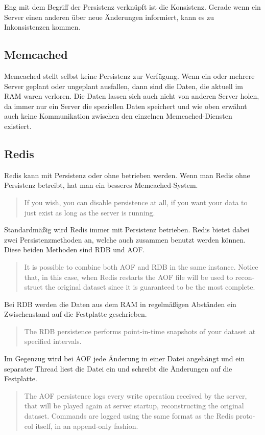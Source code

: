 Eng mit dem Begriff der Persistenz verknüpft ist die Konsistenz. Gerade wenn
ein Server einen anderen über neue Änderungen informiert, kann es zu
Inkonsistenzen kommen.

\subsection{Memcached}
Memcached stellt selbst keine Persistenz zur Verfügung. Wenn ein oder mehrere
Server geplant oder ungeplant ausfallen, dann sind die Daten, die aktuell im
\gls{RAM} waren verloren. Die Daten lassen sich auch nicht von anderen Server
holen, da immer nur ein Server die speziellen Daten speichert und wie oben
erwähnt auch keine Kommunikation zwischen den einzelnen Memcached-Diensten
existiert.

\subsection{Redis}
Redis kann mit Persistenz oder ohne betrieben werden. Wenn man Redis ohne
Persistenz betreibt, hat man ein besseres Memcached-System.

\foreignblockquote{english}[\cite{Redis2010}]{If you wish, you can
disable persistence at all, if you want your data to just exist as long as the
server is running.}

Standardmäßig wird Redis immer mit Persistenz betrieben. Redis bietet dabei
zwei Persistenzmethoden an, welche auch zusammen benutzt werden können. Diese
beiden Methoden sind \gls{RDB} und \gls{AOF}.

\foreignblockquote{english}[\cite{Redis2010}]{It is possible to combine both
AOF and RDB in the same instance. Notice that, in this case, when Redis
restarts the AOF file will be used to reconstruct the original dataset since it
is guaranteed to be the most complete.}

Bei \gls{RDB} werden die Daten aus dem \gls{RAM} in regelmäßigen Abständen ein
Zwischenstand auf die Festplatte geschrieben.

\foreignblockquote{english}[\cite{Redis2010}]{The RDB persistence performs
point-in-time snapshots of your dataset at specified intervals.}

Im Gegenzug wird bei \gls{AOF} jede Änderung in einer Datei angehängt und ein
separater Thread liest die Datei ein und schreibt die Änderungen auf die
Festplatte.

\foreignblockquote{english}[\cite{Redis2010}]{The AOF persistence logs every
write operation received by the server, that will be played again at server
startup, reconstructing the original dataset. Commands are logged using the same
format as the Redis protocol itself, in an append-only fashion.}

